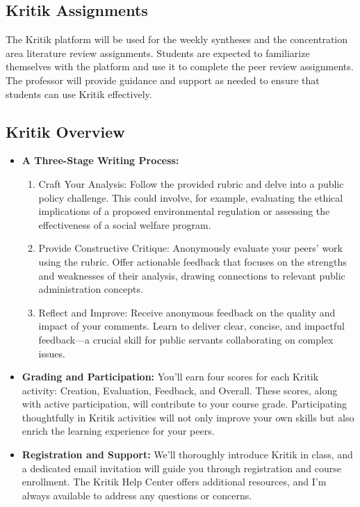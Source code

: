 \documentclass[12pt, letterpaper]{article}
\begin{document}
\subsection*{Kritik Assignments}
\noindent The Kritik platform will be used for the weekly syntheses and the concentration area literature review assignments. Students are expected to familiarize themselves with the platform and use it to complete the peer review assignments. The professor will provide guidance and support as needed to ensure that students can use Kritik effectively.

\subsection*{Kritik Overview}

\begin{itemize}

\item \textbf{A Three-Stage Writing Process:}

\begin{enumerate}
    \item Craft Your Analysis: Follow the provided rubric and delve into a public policy challenge. This could involve, for example, evaluating the ethical implications of a proposed environmental regulation or assessing the effectiveness of a social welfare program.
    \item Provide Constructive Critique: Anonymously evaluate your peers' work using the rubric. Offer actionable feedback that focuses on the strengths and weaknesses of their analysis, drawing connections to relevant public administration concepts.
    \item Reflect and Improve: Receive anonymous feedback on the quality and impact of your comments. Learn to deliver clear, concise, and impactful feedback—a crucial skill for public servants collaborating on complex issues.
\end{enumerate}

\item \textbf{Grading and Participation:} You'll earn four scores for each Kritik activity: Creation, Evaluation, Feedback, and Overall. These scores, along with active participation, will contribute to your course grade. Participating thoughtfully in Kritik activities will not only improve your own skills but also enrich the learning experience for your peers.

\item \textbf{Registration and Support:} We'll thoroughly introduce Kritik in class, and a dedicated email invitation will guide you through registration and course enrollment. The Kritik Help Center offers additional resources, and I'm always available to address any questions or concerns.
\end{itemize}
\end{document}
